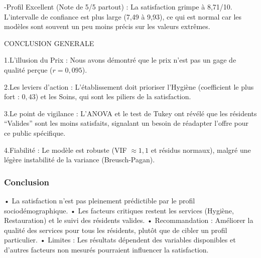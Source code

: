 \documentclass[
]{article}
\begin{document}
-Profil Excellent (Note de 5/5 partout) : La satisfaction grimpe à
8,71/10. L'intervalle de confiance est plus large (7,49 à 9,93), ce qui
est normal car les modèles sont souvent un peu moins précis sur les
valeurs extrêmes.

CONCLUSION GENERALE

1.L'illusion du Prix : Nous avons démontré que le prix n'est pas un gage
de qualité perçue (\(r = 0,095\)).

2.Les leviers d'action : L'établissement doit prioriser l'Hygiène
(coefficient le plus fort : \(0,43\)) et les Soins, qui sont les piliers
de la satisfaction.

3.Le point de vigilance : L'ANOVA et le test de Tukey ont révélé que les
résidents ``Valides'' sont les moins satisfaits, signalant un besoin de
réadapter l'offre pour ce public spécifique.

4.Fiabilité : Le modèle est robuste (VIF \(\approx 1,1\) et résidus
normaux), malgré une légère instabilité de la variance (Breusch-Pagan).

\subsubsection{Conclusion}\label{conclusion}

• La satisfaction n'est pas pleinement prédictible par le profil
sociodémographique. • Les facteurs critiques restent les services
(Hygiène, Restauration) et le suivi des résidents valides. •
Recommandation : Améliorer la qualité des services pour tous les
résidents, plutôt que de cibler un profil particulier. • Limites : Les
résultats dépendent des variables disponibles et d'autres facteurs non
mesurés pourraient influencer la satisfaction.
\end{document}
